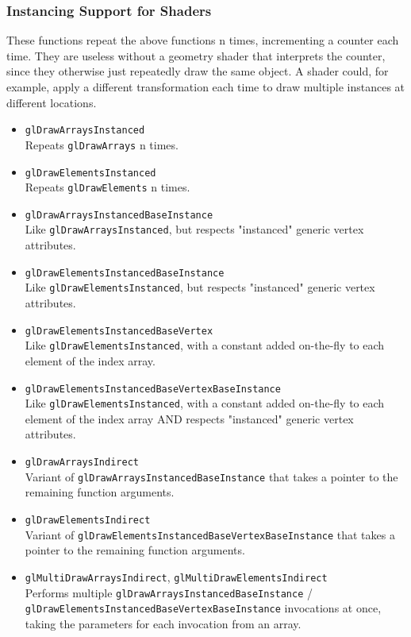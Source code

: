 \documentclass[12pt]{article}
\begin{document}
\subsubsection{Instancing Support for Shaders}
These functions repeat the above functions n times, incrementing a counter each time. They are useless without a
geometry shader that interprets the counter, since they otherwise just repeatedly draw the same object. A shader could,
for example, apply a different transformation each time to draw multiple instances at different locations.
\begin{itemize}
\item \texttt{glDrawArraysInstanced} \\
	Repeats \texttt{glDrawArrays} n times.
\item \texttt{glDrawElementsInstanced} \\
	Repeats \texttt{glDrawElements} n times.
\item \texttt{glDrawArraysInstancedBaseInstance} \\
	Like \texttt{glDrawArraysInstanced}, but respects "instanced" generic vertex attributes.
\item \texttt{glDrawElementsInstancedBaseInstance} \\
	Like \texttt{glDrawElementsInstanced}, but respects "instanced" generic vertex attributes.
\item \texttt{glDrawElementsInstancedBaseVertex} \\
	Like \texttt{glDrawElementsInstanced}, with a constant added on-the-fly to each element of the index array.
\item \texttt{glDrawElementsInstancedBaseVertexBaseInstance} \\
	Like \texttt{glDrawElementsInstanced}, with a constant added on-the-fly to each element of the index array AND
	respects "instanced" generic vertex attributes.
\item \texttt{glDrawArraysIndirect} \\
	Variant of \texttt{glDrawArraysInstancedBaseInstance} that takes a pointer to the remaining function arguments.
\item \texttt{glDrawElementsIndirect} \\
	Variant of \texttt{glDrawElementsInstancedBaseVertexBaseInstance} that takes a pointer to the remaining function
	arguments.
\item \texttt{glMultiDrawArraysIndirect}, \texttt{glMultiDrawElementsIndirect} \\
	Performs multiple \texttt{glDrawArraysInstancedBaseInstance} / \texttt{glDrawElementsInstancedBaseVertexBaseInstance}
	invocations at once, taking the parameters for each invocation from an array.
\end{itemize}
\end{document}
